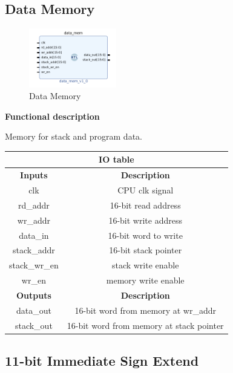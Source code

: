 \documentclass{article}
\begin{document}
\begin{par}
	\newpage
	
	\subsection{Data Memory}
	
	\begin{figure}[H]
		\centering
		\includegraphics[width=1.5in]{img/dataMem.png}
		\caption{Data Memory}
	\end{figure}

	\textbf{Functional description}
	\begin{par}
		Memory for stack and program data. 
	\end{par}
	
	\begin{center}
		\begin{tabular}{|c|c|}
			\hline 
			\multicolumn{2}{|c|}{\textbf{IO table}} \\
			\hline 
			\textbf{Inputs} & \textbf{Description} \\ 
			\hline 
			clk & CPU clk signal \\ 
			\hline 
			rd\_addr & 16-bit read address \\ 
			\hline 
			wr\_addr & 16-bit write address \\ 
			\hline 
			data\_in & 16-bit word to write \\ 
			\hline 
			stack\_addr & 16-bit stack pointer \\ 
			\hline 
			stack\_wr\_en & stack write enable \\ 
			\hline 
			wr\_en & memory write enable \\ 
			\hline 
			\textbf{Outputs} & \textbf{Description} \\ 
			\hline 
			data\_out & 16-bit word from memory at wr\_addr \\
			\hline
			stack\_out & 16-bit word from memory at stack pointer \\
			\hline
		\end{tabular} 
	\end{center}

	\subsection{11-bit Immediate Sign Extend}
	

\end{par}
\end{document}
